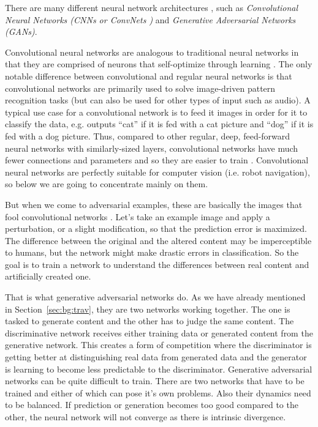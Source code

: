 \documentclass[12pt,a4paper]{report}
\newcommand{\alleg}{\enquote}
\newcommand{\term}{\textit}
\newcommand{\acronym}{\MakeUppercase}
\begin{document}
	There are many different neural network architectures \citep{Veen}, such as 
	\term{Convolutional Neural Networks (\acronym{cnn}s or ConvNets \citep{Simonyan_vgg})} 
	and \term{Generative Adversarial Networks (\acronym{gan}s)}.
	\par
	Convolutional neural networks are analogous to traditional neural networks in 
	that they are comprised of neurons that self-optimize through learning \citep{Shea}. 
	The only notable difference between convolutional and regular neural networks is 
	that convolutional networks are primarily used to solve image-driven pattern 
	recognition tasks (but can also be used for other types of input such as audio). 
	A typical use case for a convolutional network is to feed it images in order for 
	it to classify the data, e.g. outputs \alleg{cat} if it is fed with a cat picture 
	and \alleg{dog} if it is fed with a dog picture. Thus, compared to other regular, 
	deep, feed-forward neural networks with similarly-sized layers, convolutional 
	networks have much fewer connections and parameters and so they are easier to train 
	\citep{Krizhevsky_alexnet}. Convolutional neural networks are perfectly suitable for 
	computer vision (i.e. robot navigation), so below we are going to concentrate 
	mainly on them.
	\par
	But when we come to adversarial examples, these are basically the images that fool 
	convolutional networks \citep{Deshpande}. Let’s take an example image and apply 
	a perturbation, or a slight modification, so that the prediction error is maximized. 
	The difference between the original and the altered content may be imperceptible 
	to humans, but the network might make drastic errors in classification. So the 
	goal is to train a network to understand the differences between real content and 
	artificially created one. 
	\par
	That is what generative adversarial networks 
	\citep{Goodfellow} do. As we have already mentioned in Section~\ref{sec:bg:trav}, 
	they are two networks working together. The one is tasked 
	to generate content and the other has to judge the same content. The discriminative 
	network receives either training data or generated content from the generative 
	network. This creates a form of competition where the discriminator is getting 
	better at distinguishing real data from generated data and the generator is 
	learning to become less predictable to the discriminator. Generative adversarial 
	networks can be quite difficult to train. There are two networks that have to be 
	trained and either of which can pose it’s own problems. Also their dynamics need 
	to be balanced. If prediction or generation becomes too good compared to the other, 
	the neural network will not converge as there is intrinsic divergence.
	\\
	
\end{document}
